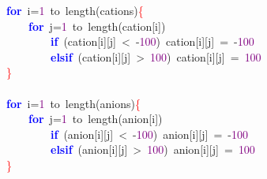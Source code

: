 \noindent
\mbox{}\textbf{\textcolor{Blue}{for}}\ i\textcolor{BrickRed}{=}\textcolor{Purple}{1}\ to\ length\textcolor{BrickRed}{(}cations\textcolor{BrickRed}{)}\textcolor{Red}{\{} \\
\mbox{}\ \ \ \ \textbf{\textcolor{Blue}{for}}\ j\textcolor{BrickRed}{=}\textcolor{Purple}{1}\ to\ length\textcolor{BrickRed}{(}cation\textcolor{BrickRed}{[}i\textcolor{BrickRed}{])} \\
\mbox{}\ \ \ \ \ \ \ \ \textbf{\textcolor{Blue}{if}}\ \textcolor{BrickRed}{(}cation\textcolor{BrickRed}{[}i\textcolor{BrickRed}{][}j\textcolor{BrickRed}{]}\ \textcolor{BrickRed}{\textless{}}\ \textcolor{BrickRed}{-}\textcolor{Purple}{100}\textcolor{BrickRed}{)}\ cation\textcolor{BrickRed}{[}i\textcolor{BrickRed}{][}j\textcolor{BrickRed}{]}\ \textcolor{BrickRed}{=}\ \textcolor{BrickRed}{-}\textcolor{Purple}{100} \\
\mbox{}\ \ \ \ \ \ \ \ \textbf{\textcolor{Blue}{elsif}}\ \textcolor{BrickRed}{(}cation\textcolor{BrickRed}{[}i\textcolor{BrickRed}{][}j\textcolor{BrickRed}{]}\ \textcolor{BrickRed}{\textgreater{}}\ \textcolor{Purple}{100}\textcolor{BrickRed}{)}\ cation\textcolor{BrickRed}{[}i\textcolor{BrickRed}{][}j\textcolor{BrickRed}{]}\ \textcolor{BrickRed}{=}\ \textcolor{Purple}{100} \\
\mbox{}\textcolor{Red}{\}} \\
\mbox{} \\
\mbox{}\textbf{\textcolor{Blue}{for}}\ i\textcolor{BrickRed}{=}\textcolor{Purple}{1}\ to\ length\textcolor{BrickRed}{(}anions\textcolor{BrickRed}{)}\textcolor{Red}{\{} \\
\mbox{}\ \ \ \ \textbf{\textcolor{Blue}{for}}\ j\textcolor{BrickRed}{=}\textcolor{Purple}{1}\ to\ length\textcolor{BrickRed}{(}anion\textcolor{BrickRed}{[}i\textcolor{BrickRed}{])} \\
\mbox{}\ \ \ \ \ \ \ \ \textbf{\textcolor{Blue}{if}}\ \textcolor{BrickRed}{(}anion\textcolor{BrickRed}{[}i\textcolor{BrickRed}{][}j\textcolor{BrickRed}{]}\ \textcolor{BrickRed}{\textless{}}\ \textcolor{BrickRed}{-}\textcolor{Purple}{100}\textcolor{BrickRed}{)}\ anion\textcolor{BrickRed}{[}i\textcolor{BrickRed}{][}j\textcolor{BrickRed}{]}\ \textcolor{BrickRed}{=}\ \textcolor{BrickRed}{-}\textcolor{Purple}{100} \\
\mbox{}\ \ \ \ \ \ \ \ \textbf{\textcolor{Blue}{elsif}}\ \textcolor{BrickRed}{(}anion\textcolor{BrickRed}{[}i\textcolor{BrickRed}{][}j\textcolor{BrickRed}{]}\ \textcolor{BrickRed}{\textgreater{}}\ \textcolor{Purple}{100}\textcolor{BrickRed}{)}\ anion\textcolor{BrickRed}{[}i\textcolor{BrickRed}{][}j\textcolor{BrickRed}{]}\ \textcolor{BrickRed}{=}\ \textcolor{Purple}{100} \\
\mbox{}\textcolor{Red}{\}} \\
\mbox{}
